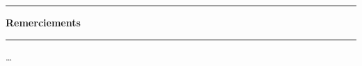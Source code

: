 \EmptyNewPage
\DontFrameThisInToc
 \hrule
  \vspace{15pt}%
  {\Huge {}\selectfont \textbf{Remerciements}}
   \par\nobreak
    \vspace{15pt}
       \hrule
   \vskip20pt
	\normalsize
	
\ldots

\EmptyNewPage
